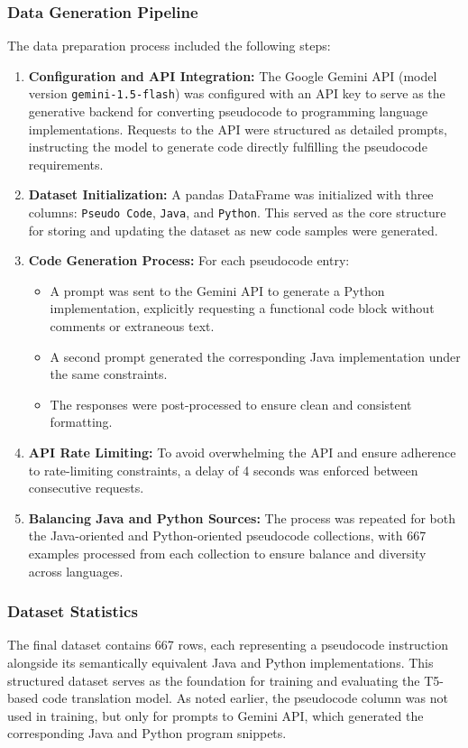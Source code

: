 \documentclass{dhbenelux}
\begin{document}
\subsubsection{Data Generation Pipeline}
The data preparation process included the following steps:
\begin{enumerate}
  \item \textbf{Configuration and API Integration:} The Google Gemini API (model version \texttt{gemini-1.5-flash}) was configured with an API key to serve as the generative backend for converting pseudocode to programming language implementations. Requests to the API were structured as detailed prompts, instructing the model to generate code directly fulfilling the pseudocode requirements.
  \item \textbf{Dataset Initialization:} A pandas DataFrame was initialized with three columns: \texttt{Pseudo Code}, \texttt{Java}, and \texttt{Python}. This served as the core structure for storing and updating the dataset as new code samples were generated.
  \item \textbf{Code Generation Process:} For each pseudocode entry:
    \begin{itemize}
        \item A prompt was sent to the Gemini API to generate a Python implementation, explicitly requesting a functional code block without comments or extraneous text.
        \item A second prompt generated the corresponding Java implementation under the same constraints.
        \item The responses were post-processed to ensure clean and consistent formatting.
    \end{itemize}
  \item \textbf{API Rate Limiting:} To avoid overwhelming the API and ensure adherence to rate-limiting constraints, a delay of 4 seconds was enforced between consecutive requests.
  \item \textbf{Balancing Java and Python Sources:} The process was repeated for both the Java-oriented and Python-oriented pseudocode collections, with 667 examples processed from each collection to ensure balance and diversity across languages.
\end{enumerate}

\subsubsection{Dataset Statistics} The final dataset contains 667 rows, each representing a pseudocode instruction alongside its semantically equivalent Java and Python implementations. This structured dataset serves as the foundation for training and evaluating the T5-based code translation model. As noted earlier, the pseudocode column was not used in training, but only for prompts to Gemini API, which generated the corresponding Java and Python program snippets.
\end{document}
